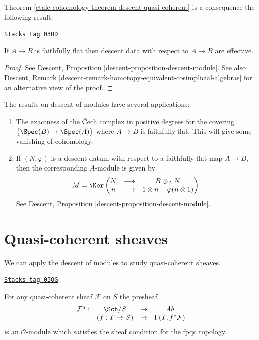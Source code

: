 Theorem \ref{etale-cohomology-theorem-descent-quasi-coherent} is a consequence the
following result.

\begin{theorem}
\label{etale-cohomology-theorem-descent-modules}
\href{https://stacks.math.columbia.edu/tag/03OD}{\texttt{Stacks tag 03OD}}

If $A \to B$ is faithfully flat then descent data with respect to $A\to B$
are effective.
\end{theorem}

\begin{proof}
See
Descent, Proposition \ref{descent-proposition-descent-module}.
See also
Descent, Remark \ref{descent-remark-homotopy-equivalent-cosimplicial-algebras}
for an alternative view of the proof.
\end{proof}

\begin{remarks}
\label{remarks-theorem-modules-exactness}
The results on descent of modules have several applications:
\begin{enumerate}
\item The exactness of the {\v C}ech complex in positive degrees for
the covering $\{\Spec(B) \to \Spec(A)\}$ where $A \to B$ is
faithfully flat. This will give some vanishing of cohomology.
\item If $(N, \varphi)$ is a descent datum with respect to a faithfully
flat map $A \to B$, then the corresponding $A$-module is given by
$$
M = \Ker \left(
\begin{matrix}
N & \longrightarrow & B \otimes_A N \\
n & \longmapsto & 1 \otimes n - \varphi(n \otimes 1)
\end{matrix}
\right).
$$
See
Descent, Proposition \ref{descent-proposition-descent-module}.
\end{enumerate}
\end{remarks}



\section{Quasi-coherent sheaves}
\label{etale-cohomology-section-quasi-coherent}
We can apply the descent of modules to study quasi-coherent sheaves.

\begin{proposition}
\label{etale-cohomology-proposition-quasi-coherent-sheaf-fpqc}
\href{https://stacks.math.columbia.edu/tag/03OG}{\texttt{Stacks tag 03OG}}

For any quasi-coherent sheaf $\mathcal{F}$ on $S$ the presheaf
$$
\begin{matrix}
\mathcal{F}^a : & \Sch/S & \to & \textit{Ab}\\
& (f: T \to S) & \mapsto & \Gamma(T, f^*\mathcal{F})
\end{matrix}
$$
is an $\mathcal{O}$-module which satisfies the sheaf condition for the
fpqc topology.
\end{proposition}

